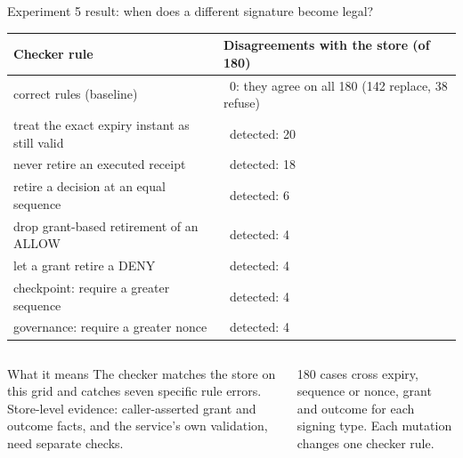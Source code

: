 \documentclass[aspectratio=169,10pt]{beamer}
\newcommand{\cmark}{\textcolor{okgreen}{\ding{51}}}
\begin{document}
\begin{frame}{Experiment 5 result: when does a different signature become legal?}
\vspace{0.3em}
\scriptsize
\renewcommand{\arraystretch}{1.1}
\begin{tabular}{@{}L{0.50\textwidth} L{0.47\textwidth}@{}}
\toprule
\textbf{Checker rule} & \textbf{Disagreements with the store (of 180)} \\
\midrule
correct rules (baseline) & \cmark\ 0: they agree on all 180 (142 replace, 38 refuse) \\
treat the exact expiry instant as still valid & \cmark\ detected: 20 \\
never retire an executed receipt & \cmark\ detected: 18 \\
retire a decision at an equal sequence & \cmark\ detected: 6 \\
drop grant-based retirement of an ALLOW & \cmark\ detected: 4 \\
let a grant retire a DENY & \cmark\ detected: 4 \\
checkpoint: require a greater sequence & \cmark\ detected: 4 \\
governance: require a greater nonce & \cmark\ detected: 4 \\
\bottomrule
\end{tabular}

\vspace{0.5em}
\begin{columns}[T,onlytextwidth]
\begin{alertblock}{What it means}
\scriptsize The checker matches the store on this grid and catches seven specific rule errors. Store-level evidence: caller-asserted grant and outcome facts, and the service's own validation, need separate checks.
\end{alertblock}
\scriptsize\color{datagray}
180 cases cross expiry, sequence or nonce, grant and outcome for each signing type. Each mutation changes one checker rule.\\[3pt]
\end{columns}
\end{frame}
\end{document}
